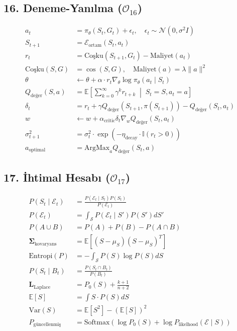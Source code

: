 \documentclass[11pt, a4paper]{article}
\begin{document}
\subsection{16. Deneme-Yanılma ($\mathcal{O}_{16}$)}
\begin{align}
a_t &= \pi_\theta(S_t, G_t) + \epsilon_t, \quad \epsilon_t \sim \mathcal{N}(0, \sigma^2 I) \\
S_{t+1} &= \mathcal{E}_{\text{ortam}}(S_t, a_t) \\
r_t &= \text{Coşku}(S_{t+1}, G_t) - \text{Maliyet}(a_t) \\
\text{Coşku}(S, G) &= \cos(S, G), \quad \text{Maliyet}(a) = \lambda \|a\|^2 \\
\theta &\leftarrow \theta + \alpha \cdot r_t \nabla_\theta \log \pi_\theta(a_t \mid S_t) \\
Q_{\text{değer}}(S, a) &= \mathbb{E}\left[ \sum_{k=0}^\infty \gamma^k r_{t+k} \;\middle|\; S_t=S, a_t=a \right] \\
\delta_t &= r_t + \gamma Q_{\text{değer}}(S_{t+1}, \pi(S_{t+1})) - Q_{\text{değer}}(S_t, a_t) \\
w &\leftarrow w + \alpha_{\text{critic}} \delta_t \nabla_w Q_{\text{değer}}(S_t, a_t) \\
\sigma^2_{t+1} &= \sigma^2_t \cdot \exp(-\eta_{\text{decay}} \cdot \mathbb{I}(r_t > 0)) \\
a_{\text{optimal}} &= \text{ArgMax}_a Q_{\text{değer}}(S_t, a)
\end{align}

\subsection{17. İhtimal Hesabı ($\mathcal{O}_{17}$)}
\begin{align}
P(S_t \mid \mathcal{E}_t) &= \frac{P(\mathcal{E}_t \mid S_t) P(S_t)}{P(\mathcal{E}_t)} \\
P(\mathcal{E}_t) &= \int_{\mathcal{S}} P(\mathcal{E}_t \mid S') P(S') dS' \\
P(A \cup B) &= P(A) + P(B) - P(A \cap B) \\
\mathbf{\Sigma}_{\text{kovaryans}} &= \mathbb{E}\left[ (S - \mu_S)(S - \mu_S)^T \right] \\
\text{Entropi}(P) &= -\int_{\mathcal{S}} P(S) \log P(S) dS \\
P(S_t \mid B_t) &= \frac{P(S_t \cap B_t)}{P(B_t)} \\
\mathbf{L}_{\text{Laplace}} &= P_0(S) + \frac{k+1}{n+2} \\
\mathbb{E}[S] &= \int S \cdot P(S) dS \\
\text{Var}(S) &= \mathbb{E}[S^2] - (\mathbb{E}[S])^2 \\
P_{\text{güncellenmiş}} &= \text{Softmax}(\log P_0(S) + \log P_{\text{likelhood}}(\mathcal{E} \mid S))
\end{align}
\end{document}
